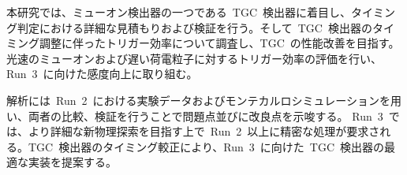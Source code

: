 \newpage
本研究では、ミューオン検出器の一つである~TGC~検出器に着目し、タイミング判定における詳細な見積もりおよび検証を行う。そして~TGC~検出器のタイミング調整に伴ったトリガー効率について調査し、TGC~の性能改善を目指す。光速のミューオンおよび遅い荷電粒子に対するトリガー効率の評価を行い、Run~3~に向けた感度向上に取り組む。

解析には~Run~2~における実験データおよびモンテカルロシミュレーションを用い、両者の比較、検証を行うことで問題点並びに改良点を示唆する。
Run~3~では、より詳細な新物理探索を目指す上で~Run~2~以上に精密な処理が要求される。TGC~検出器のタイミング較正により、Run~3~に向けた~TGC~検出器の最適な実装を提案する。
